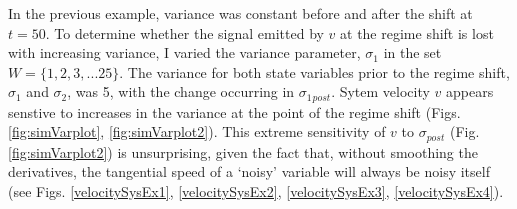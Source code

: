 \documentclass[12pt,twoside,openany]{reedthesis}
\newenvironment{Shaded}{\begin{snugshade}}{\end{snugshade}}
\newcommand{\DataTypeTok}[1]{\textcolor[rgb]{0.13,0.29,0.53}{#1}}
\newcommand{\DecValTok}[1]{\textcolor[rgb]{0.00,0.00,0.81}{#1}}
\newcommand{\KeywordTok}[1]{\textcolor[rgb]{0.13,0.29,0.53}{\textbf{#1}}}
\newcommand{\NormalTok}[1]{#1}
\newcommand{\OperatorTok}[1]{\textcolor[rgb]{0.81,0.36,0.00}{\textbf{#1}}}
\newcommand{\StringTok}[1]{\textcolor[rgb]{0.31,0.60,0.02}{#1}}
\begin{document}
In the previous example, variance was constant before and after the shift at \(t=50\). To determine whether the signal emitted by \(v\) at the regime shift is lost with increasing variance, I varied the variance parameter, \(\sigma_1\) in the set \(W = \{1,2,3,...25 \}\). The variance for both state variables prior to the regime shift, \(\sigma_1\) and \(\sigma_2\), was 5, with the change occurring in \(\sigma_1{_{post}}\). Sytem velocity \(v\) appears senstive to increases in the variance at the point of the regime shift (Figs. \ref{fig:simVarplot}, \ref{fig:simVarplot2}). This extreme sensitivity of \(v\) to \(\sigma{_{post}}\) (Fig. \ref{fig:simVarplot2}) is unsurprising, given the fact that, without smoothing the derivatives, the tangential speed of a `noisy' variable will always be noisy itself (see Figs. \ref{velocitySysEx1}, \ref{velocitySysEx2}, \ref{velocitySysEx3}, \ref{velocitySysEx4}).
\begin{Shaded}
\end{Shaded}
\end{document}
